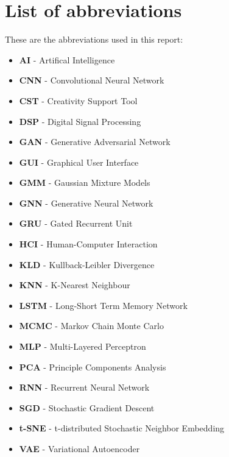 \chapter*{List of abbreviations}

These are the abbreviations used in this report: 
\begin{itemize}
\item \textbf{AI} - Artifical Intelligence
\item \textbf{CNN} - Convolutional Neural Network
\item \textbf{CST} - Creativity Support Tool
\item \textbf{DSP} - Digital Signal Processing
\item \textbf{GAN} - Generative Adversarial Network
\item \textbf{GUI} - Graphical User Interface
\item \textbf{GMM} - Gaussian Mixture Models
\item \textbf{GNN} - Generative Neural Network
\item \textbf{GRU} - Gated Recurrent Unit
\item \textbf{HCI} - Human-Computer Interaction
\item \textbf{KLD} - Kullback-Leibler Divergence
\item \textbf{KNN} - K-Nearest Neighbour
\item \textbf{LSTM} - Long-Short Term Memory Network
\item \textbf{MCMC} - Markov Chain Monte Carlo
\item \textbf{MLP} - Multi-Layered Perceptron
\item \textbf{PCA} - Principle Components Analysis
\item \textbf{RNN} - Recurrent Neural Network
\item \textbf{SGD} - Stochastic Gradient Descent
\item \textbf{t-SNE} - t-distributed Stochastic Neighbor Embedding
\item \textbf{VAE} - Variational Autoencoder
\end{itemize}